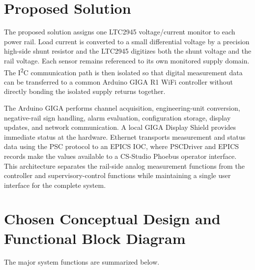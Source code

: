 \section{Proposed Solution}
The proposed solution assigns one LTC2945 voltage/current monitor to each power
rail. Load current is converted to a small differential voltage by a precision
high-side shunt resistor and the LTC2945 digitizes both the shunt voltage and the
rail voltage. Each sensor remains referenced to its own monitored supply domain.
The I\textsuperscript{2}C communication path is then isolated so that digital
measurement data can be transferred to a common Arduino GIGA R1 WiFi controller
without directly bonding the isolated supply returns together.

The Arduino GIGA performs channel acquisition, engineering-unit conversion,
negative-rail sign handling, alarm evaluation, configuration storage, display
updates, and network communication. A local GIGA Display Shield provides
immediate status at the hardware. Ethernet transports measurement and status
data using the PSC protocol to an EPICS IOC, where PSCDriver and EPICS records
make the values available to a CS-Studio Phoebus operator interface. This
architecture separates the rail-side analog measurement functions from the
controller and supervisory-control functions while maintaining a single user
interface for the complete system.

\section{Chosen Conceptual Design and Functional Block Diagram}
\label{sec:functional-blocks}
The major system functions are summarized below.

